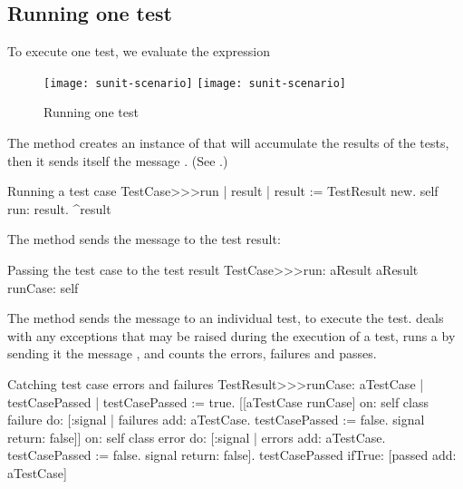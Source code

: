 \documentclass[a4paper,10pt,twoside]{book}
\begin{document}
\subsection{Running one test}

To execute one test, we evaluate the expression


\begin{figure}[tbh]
  \begin{center}
  	\ifluluelse
		{\texttt{[image: sunit-scenario]}}
		{\texttt{[image: sunit-scenario]}}
	\caption{Running one test}
	\label{fig:sunit-scenario}
  \end{center}
\end{figure}

The method  creates an instance of
 that will accumulate the results of the
tests, then it sends itself the message .
(See .)

\begin{method}[tastecaserun]{Running a test case}
TestCase>>>run
	| result |
	result := TestResult new.
	self run: result.
	^result
\end{method}


The method
 sends the message
 to the test result:

\begin{method}[testcaserun:]{Passing the test case to the test result}
TestCase>>>run: aResult
	aResult runCase: self
\end{method}
The method  sends
the message  to an individual test, to execute the test.
 deals with 
any exceptions that may be raised during the
execution of a test, runs a  by sending it the
message , and counts the errors, failures
and passes.
\begin{method}[testresultruncase]{Catching test case errors and failures}
TestResult>>>runCase: aTestCase
	| testCasePassed |
	testCasePassed := true.
	[[aTestCase runCase] 
			on: self class failure
			do: 
				[:signal | 
				failures add: aTestCase.
				testCasePassed := false.
				signal return: false]]
					on: self class error
					do:
						[:signal |
						errors add: aTestCase.
						testCasePassed := false.
						signal return: false].
	testCasePassed ifTrue: [passed add: aTestCase]
\end{method}
\end{document}
